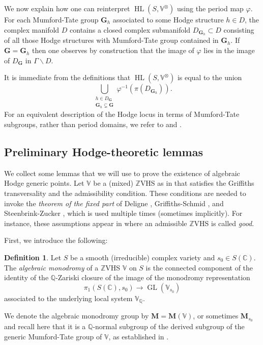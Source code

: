 \documentclass[10pt]{article}
\numberwithin{equation}{section}
\theoremstyle{plain}
\theoremstyle{definition}
\newtheorem{defn}[thm]{Definition}
\theoremstyle{remark}
\newcommand{\HL}{\operatorname{HL}}
\newcommand{\GL}{\operatorname{GL}}
\newcommand{\C}{\mathbb{C}}
\newcommand{\Q}{\mathbb{Q}}
\newcommand{\Z}{\mathbb{Z}}
\newcommand{\V}{\mathbb{V}}
\begin{document}
We now explain how one can reinterpret $\HL(S,\V^\otimes)$ using the period map $\varphi$. For each Mumford-Tate group $\mathbf{G}_{h}$ associated to some Hodge structure $h \in D$, the complex manifold $D$ contains a closed complex submanifold $D_{\mathbf{G}_{h}} \subset D$ consisting of all those Hodge structures with Mumford-Tate group contained in $\mathbf{G}_{h}$. If $\mathbf{G} = \mathbf{G}_{h}$ then one observes by construction that the image of $\varphi$ lies in the image of $D_{\mathbf{G}}$ in $\Gamma \backslash D$.

It is immediate from the definitions that $\HL(S, \V^{\otimes})$ is equal to the union
\[ \bigcup_{\substack{h \in D_{\mathbf{G}} \\ \mathbf{G}_h \subsetneq \mathbf{G}}} \varphi^{-1}(\pi(D_{\mathbf{G}_h})) . \]
For an equivalent description of the Hodge locus in terms of Mumford-Tate subgroups, rather than period domains, we refer to \cite[Sec. 1]{2021arXiv210708838B} and \cite[Sec. 4]{2024arXiv240616628B}.




\subsection{Preliminary Hodge-theoretic lemmas}\label{lemmas}
We collect some lemmas that we will use to prove the existence of algebraic Hodge generic points. Let $\V$ be a (mixed) $\Z$VHS as in  that satisfies the Griffiths transversality and the admissibility condition. These conditions are needed to invoke the \emph{theorem of the fixed part} of Deligne \cite[Sec. 4.1]{MR0498551}, Griffiths-Schmid \cite{sch73}, and Steenbrink-Zucker \cite{zbMATH04017061}, which is used multiple times (sometimes implicitly). For instance, these assumptions appear in \cite[Thm. 1]{MR1154159} where an admissible $\mathbb{Z}$VHS is called \emph{good}. 

First, we introduce the following:
\begin{defn}\label{mondef}
Let $S$ be a smooth (irreducible) complex variety and $s_0\in S(\C)$. The \emph{algebraic monodromy} of a $\Z$VHS $\V$ on $S$ is the connected component of the identity of the $\Q$-Zariski closure of the image of the monodromy representation 
\begin{displaymath}
    \pi_1(S(\C),s_0)\to \GL(\V_{s_0})
\end{displaymath}
associated to the underlying local system $\V_\Q$.
\end{defn}
We denote the algebraic monodromy group by $\mathbf{M}=\mathbf{M}(\V)$, or sometimes $\mathbf{M}_{s_0}$ and recall here that it is a $\mathbb{Q}$-normal subgroup of the derived subgroup of the generic Mumford-Tate group of $\V$, as established in \cite[Thm. 1]{MR1154159}.
\end{document}
